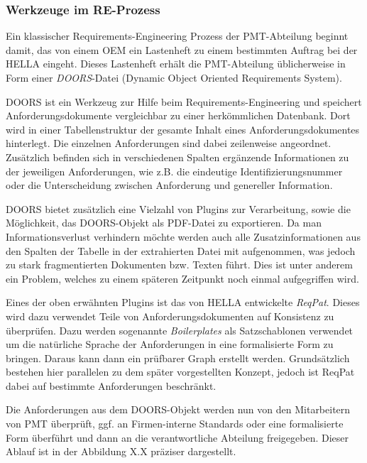 \documentclass[12pt]{report}
\begin{document}
\subsubsection{Werkzeuge im RE-Prozess}
Ein klassischer Requirements-Engineering Prozess der PMT-Abteilung beginnt damit, das von einem OEM ein Lastenheft zu einem bestimmten Auftrag bei der HELLA eingeht. Dieses Lastenheft erhält die PMT-Abteilung üblicherweise in Form einer \textit{DOORS}-Datei (Dynamic Object Oriented Requirements System). 

DOORS ist ein Werkzeug zur Hilfe beim Requirements-Engineering und speichert Anforderungsdokumente vergleichbar zu einer herkömmlichen Datenbank. Dort wird in einer Tabellenstruktur der gesamte Inhalt eines Anforderungsdokumentes hinterlegt. Die einzelnen Anforderungen sind dabei zeilenweise angeordnet. Zusätzlich befinden sich in verschiedenen Spalten ergänzende Informationen zu der jeweiligen Anforderungen, wie z.B. die eindeutige Identifizierungsnummer oder die Unterscheidung zwischen Anforderung und genereller Information.

DOORS bietet zusätzlich eine Vielzahl von Plugins zur Verarbeitung, sowie die Möglichkeit, das DOORS-Objekt als PDF-Datei zu exportieren. Da man Informationsverlust verhindern möchte werden auch alle Zusatzinformationen aus den Spalten der Tabelle in der extrahierten Datei mit aufgenommen, was jedoch zu stark fragmentierten Dokumenten bzw. Texten führt. Dies ist unter anderem ein Problem, welches zu einem späteren Zeitpunkt noch einmal aufgegriffen wird. 

Eines der oben erwähnten Plugins ist das von HELLA entwickelte \textit{ReqPat}. Dieses wird dazu verwendet Teile von Anforderungsdokumenten auf Konsistenz zu überprüfen. Dazu werden sogenannte \textit{Boilerplates} als Satzschablonen verwendet um die natürliche Sprache der Anforderungen in eine formalisierte Form zu bringen. Daraus kann dann ein prüfbarer Graph erstellt werden. Grundsätzlich bestehen hier parallelen zu dem später vorgestellten Konzept, jedoch ist ReqPat dabei auf bestimmte Anforderungen beschränkt. 

Die Anforderungen aus dem DOORS-Objekt werden nun von den Mitarbeitern von PMT überprüft, ggf. an Firmen-interne Standards oder eine formalisierte Form überführt und dann an die verantwortliche Abteilung freigegeben. Dieser Ablauf ist in der Abbildung X.X präziser dargestellt.
\end{document}
